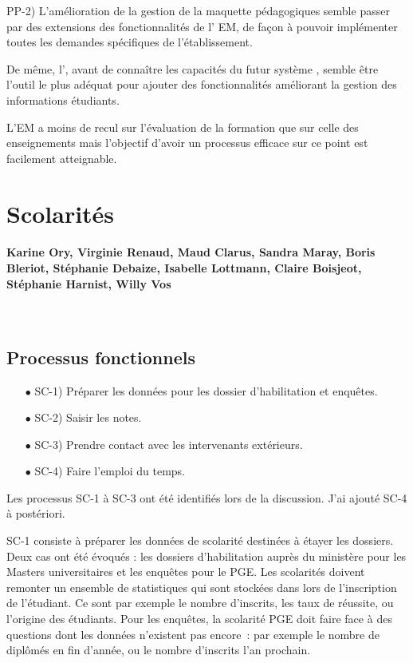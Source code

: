 \documentclass{book}
\begin{document}
PP-2) L'amélioration de la gestion de la maquette pédagogiques semble passer par
des extensions des fonctionnalités de l' EM, de façon à pouvoir
implémenter toutes les demandes spécifiques de l'établissement.

De même, l', avant de  connaître les capacités du futur système
,  semble  être   l'outil  le  plus  adéquat   pour  ajouter  des
fonctionnalités améliorant la gestion des informations étudiants.

L'EM  a moins  de recul  sur  l'évaluation de  la  formation que  sur celle  des
enseignements mais  l'objectif d'avoir  un processus efficace  sur ce  point est
facilement atteignable.


 
\section{Scolarités}


\paragraph{Karine Ory, Virginie Renaud, Maud Clarus, Sandra Maray, Boris Bleriot, 
Stéphanie Debaize, Isabelle Lottmann, Claire Boisjeot, Stéphanie Harnist, Willy Vos}
~\\

\subsection{Processus fonctionnels}


\begin{itemize}
\item[$\bullet$] SC-1) Préparer les données pour les dossier d'habilitation et enquêtes.
\item[$\bullet$] SC-2) Saisir les notes.
\item[$\bullet$] SC-3) Prendre contact avec les intervenants extérieurs.
\item[$\bullet$] SC-4) Faire l'emploi du temps.
\end{itemize}

Les processus SC-1 à SC-3 ont été identifiés lors de la discussion.
J'ai ajouté SC-4 à postériori.


\bigskip 
SC-1  consiste à  préparer  les  données de  scolarité  destinées  à étayer  les
dossiers.  Deux  cas ont  été évoqués  : les  dossiers d'habilitation  auprès du
ministère  pour les  Masters universitaires  et les  enquêtes pour  le PGE.  Les
scolarités doivent remonter  un ensemble de statistiques qui  sont stockées dans
  lors de  l'inscription de  l'étudiant. Ce  sont par  exemple le
nombre d'inscrits,  les taux de réussite,  ou l'origine des étudiants.  Pour les
enquêtes, la  scolarité PGE  doit faire  face à des  questions dont  les données
n'existent pas encore~: par exemple le nombre  de diplômés en fin d'année, ou le
nombre d'inscrits l'an prochain.\\
\end{document}
